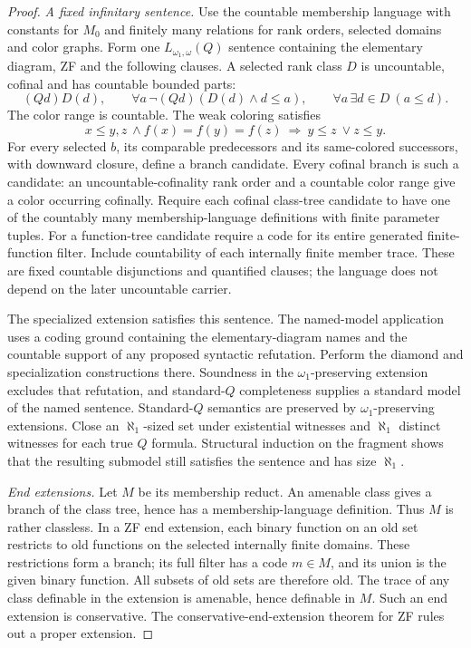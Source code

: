 \documentclass[11pt,a4paper]{amsart}
\begin{document}
\begin{proof}
\emph{A fixed infinitary sentence.} Use the countable membership language with constants for $M_0$ and finitely many relations for rank orders, selected domains and color graphs. Form one $L_{\omega_1,\omega}(Q)$ sentence containing the elementary diagram, ZF and the following clauses. A selected rank class $D$ is uncountable, cofinal and has countable bounded parts:
\[
(Qd)D(d),\qquad
\forall a\,\neg(Qd)(D(d)\land d\leq a),\qquad
\forall a\,\exists d\in D\ (a\leq d).
\]
The color range is countable. The weak coloring satisfies
\[
x\leq y,z\ \land f(x)=f(y)=f(z)\ \Longrightarrow\ y\leq z\ \lor z\leq y.
\]
For every selected $b$, its comparable predecessors and its same-colored successors, with downward closure, define a branch candidate. Every cofinal branch is such a candidate: an uncountable-cofinality rank order and a countable color range give a color occurring cofinally. Require each cofinal class-tree candidate to have one of the countably many membership-language definitions with finite parameter tuples. For a function-tree candidate require a code for its entire generated finite-function filter. Include countability of each internally finite member trace. These are fixed countable disjunctions and quantified clauses; the language does not depend on the later uncountable carrier.

The specialized extension satisfies this sentence. The named-model application uses a coding ground containing the elementary-diagram names and the countable support of any proposed syntactic refutation. Perform the diamond and specialization constructions there. Soundness in the $\omega_1$-preserving extension excludes that refutation, and standard-$Q$ completeness \cite{Keisler} supplies a standard model of the named sentence. Standard-$Q$ semantics are preserved by $\omega_1$-preserving extensions. Close an $\aleph_1$-sized set under existential witnesses and $\aleph_1$ distinct witnesses for each true $Q$ formula. Structural induction on the fragment shows that the resulting submodel still satisfies the sentence and has size $\aleph_1$.

\emph{End extensions.} Let $M$ be its membership reduct. An amenable class gives a branch of the class tree, hence has a membership-language definition. Thus $M$ is rather classless. In a ZF end extension, each binary function on an old set restricts to old functions on the selected internally finite domains. These restrictions form a branch; its full filter has a code $m\in M$, and its union is the given binary function. All subsets of old sets are therefore old. The trace of any class definable in the extension is amenable, hence definable in $M$. Such an end extension is conservative. The conservative-end-extension theorem for ZF \cite{Enayat} rules out a proper extension.
\end{proof}
\end{document}
